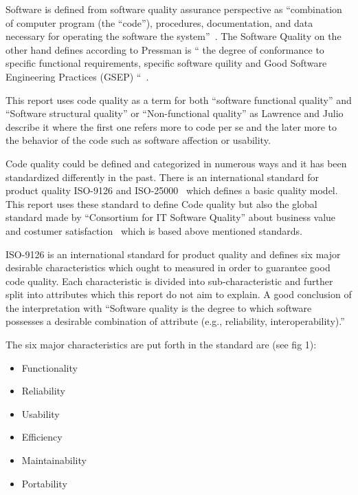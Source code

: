 Software is defined from software quality assurance perspective as “combination of computer program (the “code”), procedures, documentation, and data necessary for operating the software the system”~\cite{Galin}. The Software Quality on the other hand defines according to Pressman is “ the degree of conformance to specific functional requirements, specific software quility and Good Software Engineering Practices (GSEP) “~\cite{Pressman}.

This report uses code quality as a term for both “software functional quality” and “Software structural quality” or “Non-functional quality” as Lawrence and Julio~\cite{Chung} describe it where the first one refers more to code per se and the later more to the behavior of the code such as software affection or usability. 

Code quality could be defined and categorized in numerous ways and it has been standardized differently in the past. There is an international standard for product quality ISO-9126 and ISO-25000~\cite{ISO9126}  which defines a basic quality model. This report uses these standard to define Code quality but also the global standard made by “Consortium for IT Software Quality” about business value and costumer satisfaction~\cite{cisq} which is based above mentioned standards. 

ISO-9126 is an international standard for product quality and defines six major desirable characteristics which ought to measured in order to guarantee good code quality. Each characteristic is divided into sub-characteristic and further split into attributes which this report do not aim to explain. A good conclusion of the interpretation with 
“Software quality is the degree to which software possesses a desirable combination of attribute (e.g., reliability, interoperability).”~\cite{ISO1061}

The six major characteristics are put forth in the standard are (see fig 1): 
\begin{itemize}
\item Functionality 
\item Reliability
\item Usability
\item Efficiency
\item Maintainability
\item Portability
\end{itemize}